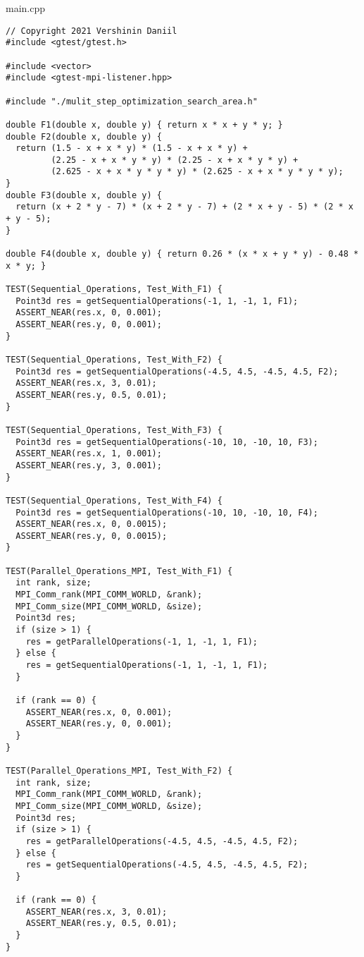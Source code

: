 \documentclass{report}
\begin{document}
main.cpp
\begin{lstlisting}
// Copyright 2021 Vershinin Daniil
#include <gtest/gtest.h>

#include <vector>
#include <gtest-mpi-listener.hpp>

#include "./mulit_step_optimization_search_area.h"

double F1(double x, double y) { return x * x + y * y; }
double F2(double x, double y) {
  return (1.5 - x + x * y) * (1.5 - x + x * y) +
         (2.25 - x + x * y * y) * (2.25 - x + x * y * y) +
         (2.625 - x + x * y * y * y) * (2.625 - x + x * y * y * y);
}
double F3(double x, double y) {
  return (x + 2 * y - 7) * (x + 2 * y - 7) + (2 * x + y - 5) * (2 * x + y - 5);
}

double F4(double x, double y) { return 0.26 * (x * x + y * y) - 0.48 * x * y; }

TEST(Sequential_Operations, Test_With_F1) {
  Point3d res = getSequentialOperations(-1, 1, -1, 1, F1);
  ASSERT_NEAR(res.x, 0, 0.001);
  ASSERT_NEAR(res.y, 0, 0.001);
}

TEST(Sequential_Operations, Test_With_F2) {
  Point3d res = getSequentialOperations(-4.5, 4.5, -4.5, 4.5, F2);
  ASSERT_NEAR(res.x, 3, 0.01);
  ASSERT_NEAR(res.y, 0.5, 0.01);
}

TEST(Sequential_Operations, Test_With_F3) {
  Point3d res = getSequentialOperations(-10, 10, -10, 10, F3);
  ASSERT_NEAR(res.x, 1, 0.001);
  ASSERT_NEAR(res.y, 3, 0.001);
}

TEST(Sequential_Operations, Test_With_F4) {
  Point3d res = getSequentialOperations(-10, 10, -10, 10, F4);
  ASSERT_NEAR(res.x, 0, 0.0015);
  ASSERT_NEAR(res.y, 0, 0.0015);
}

TEST(Parallel_Operations_MPI, Test_With_F1) {
  int rank, size;
  MPI_Comm_rank(MPI_COMM_WORLD, &rank);
  MPI_Comm_size(MPI_COMM_WORLD, &size);
  Point3d res;
  if (size > 1) {
    res = getParallelOperations(-1, 1, -1, 1, F1);
  } else {
    res = getSequentialOperations(-1, 1, -1, 1, F1);
  }

  if (rank == 0) {
    ASSERT_NEAR(res.x, 0, 0.001);
    ASSERT_NEAR(res.y, 0, 0.001);
  }
}

TEST(Parallel_Operations_MPI, Test_With_F2) {
  int rank, size;
  MPI_Comm_rank(MPI_COMM_WORLD, &rank);
  MPI_Comm_size(MPI_COMM_WORLD, &size);
  Point3d res;
  if (size > 1) {
    res = getParallelOperations(-4.5, 4.5, -4.5, 4.5, F2);
  } else {
    res = getSequentialOperations(-4.5, 4.5, -4.5, 4.5, F2);
  }

  if (rank == 0) {
    ASSERT_NEAR(res.x, 3, 0.01);
    ASSERT_NEAR(res.y, 0.5, 0.01);
  }
}


\end{lstlisting}
\end{document}
